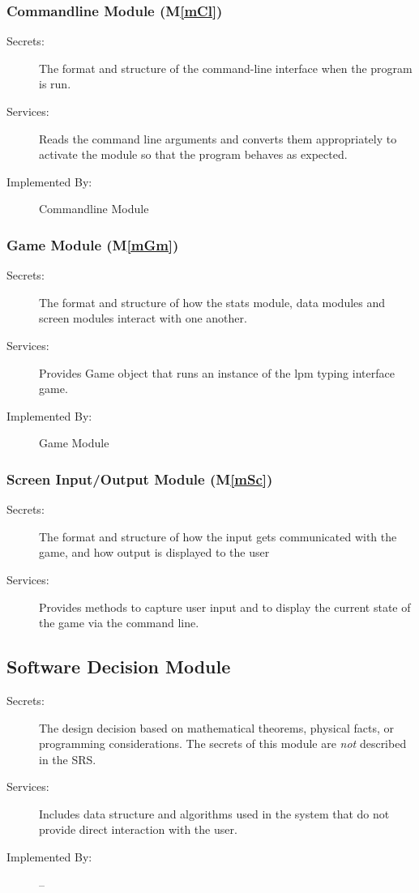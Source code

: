 \documentclass[12pt, titlepage]{article}
\newcommand{\mref}[1]{M\ref{#1}}
\begin{document}
\subsubsection{Commandline Module (\mref{mCl})}

\begin{description}
\item[Secrets:]The format and structure of the command-line interface when the program is run.
\item[Services:] Reads the command line arguments and converts them appropriately to activate the module so that the program behaves as expected.
\item[Implemented By:] Commandline Module
\end{description}

\subsubsection{Game Module (\mref{mGm})}

\begin{description}
\item[Secrets:]The format and structure of how the stats module, data modules and screen modules interact with one another.
\item[Services:] Provides Game object that runs an instance of the lpm typing interface game.
\item[Implemented By:] Game Module
\end{description}

\subsubsection{Screen Input/Output Module (\mref{mSc})}

\begin{description}
\item[Secrets:]The format and structure of how the input gets communicated with the game, and how output is displayed to the user
\item[Services:] Provides methods to capture user input and to display the current state of the game via the command line.
\end{description}

\subsection{Software Decision Module}

\begin{description}
\item[Secrets:] The design decision based on mathematical theorems, physical
  facts, or programming considerations. The secrets of this module are
  \emph{not} described in the SRS.
\item[Services:] Includes data structure and algorithms used in the system that
  do not provide direct interaction with the user.
\item[Implemented By:] --
\end{description}
\end{document}
